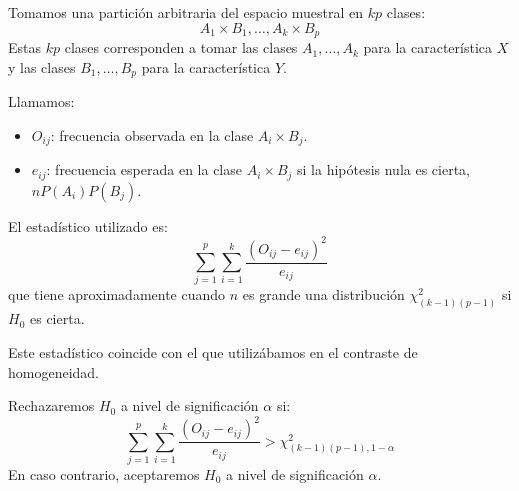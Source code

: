 Tomamos una partición arbitraria del espacio muestral en $kp$ clases:
$$A_1 \times B_1, \dots, A_k \times B_p$$
Estas $kp$ clases corresponden a tomar las clases $A_1, \dots, A_k$ para la característica $X$ y las clases $B_1, \dots, B_p$ para la característica $Y$.

Llamamos:
\begin{itemize}
    \item $O_{ij}$: frecuencia observada en la clase $A_i \times B_j$.
    \item $e_{ij}$: frecuencia esperada en la clase $A_i \times B_j$ si la hipótesis nula es cierta, $nP(A_i)P(B_j)$.
\end{itemize}

El estadístico utilizado es:
$$\sum_{j=1}^p \sum_{i=1}^k \frac{(O_{ij}-e_{ij})^2}{e_{ij}}$$
que tiene aproximadamente cuando $n$ es grande una distribución $\chi^2_{(k-1)(p-1)}$ si $H_0$ es cierta.

\begin{remark}
    Este estadístico coincide con el que utilizábamos en el contraste de homogeneidad.
\end{remark}

Rechazaremos $H_0$ a nivel de significación $\alpha$ si:
$$\sum_{j=1}^p \sum_{i=1}^k \frac{(O_{ij}-e_{ij})^2}{e_{ij}} > \chi^2_{(k-1)(p-1), 1-\alpha}$$
En caso contrario, aceptaremos $H_0$ a nivel de significación $\alpha$.

